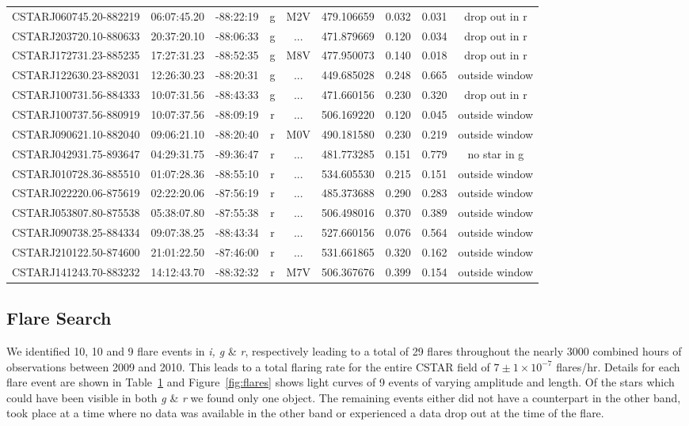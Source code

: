 \begin{landscape}
\begin{table}[H]
\begin{tabular}{ccccccccc}
CSTARJ060745.20-882219 & 06:07:45.20 & -88:22:19 & g & M2V & 479.106659 & 0.032 & 0.031 &   drop out in r \\
CSTARJ203720.10-880633 & 20:37:20.10 & -88:06:33 & g & ... & 471.879669 & 0.120 & 0.034 &   drop out in r \\
CSTARJ172731.23-885235 & 17:27:31.23 & -88:52:35 & g & M8V & 477.950073 & 0.140 & 0.018 &   drop out in r \\
CSTARJ122630.23-882031 & 12:26:30.23 & -88:20:31 & g & ... & 449.685028 & 0.248 & 0.665 &   outside window \\
CSTARJ100731.56-884333 & 10:07:31.56 & -88:43:33 & g & ... & 471.660156 & 0.230 & 0.320 &   drop out in r \\
CSTARJ100737.56-880919 & 10:07:37.56 & -88:09:19 & r & ... & 506.169220 & 0.120 & 0.045 & outside window \\
CSTARJ090621.10-882040 & 09:06:21.10 & -88:20:40 & r & M0V & 490.181580 & 0.230 & 0.219 & outside window \\
CSTARJ042931.75-893647 & 04:29:31.75 & -89:36:47 & r & ... & 481.773285 & 0.151 & 0.779 &   no star in g \\
CSTARJ010728.36-885510 & 01:07:28.36 & -88:55:10 & r & ... & 534.605530 & 0.215 & 0.151 & outside window \\
CSTARJ022220.06-875619 & 02:22:20.06 & -87:56:19 & r & ... & 485.373688 & 0.290 & 0.283 & outside window \\
CSTARJ053807.80-875538 & 05:38:07.80 & -87:55:38 & r & ... & 506.498016 & 0.370 & 0.389 & outside window \\
CSTARJ090738.25-884334 & 09:07:38.25 & -88:43:34 & r & ... & 527.660156 & 0.076 & 0.564 & outside window \\
CSTARJ210122.50-874600 & 21:01:22.50 & -87:46:00 & r & ... & 531.661865 & 0.320 & 0.162 & outside window \\
CSTARJ141243.70-883232 & 14:12:43.70 & -88:32:32 & r & M7V & 506.367676 & 0.399 & 0.154 & outside window \\
\hline
\end{tabular}
\label{tb:flare}
\end{table}
\end{landscape}


\subsection{Flare Search}
We identified 10, 10 and 9 flare events in \textit{i, g} \& \textit{r}, respectively leading to a total of 29 flares throughout the nearly $3000$ combined hours of observations between 2009 and 2010. This leads to a total flaring rate for the entire CSTAR field of $7\pm1\times10^{-7}$ flares/hr. Details for each flare event are shown in Table~\ref{tb:flare} and Figure~\ref{fig:flares} shows light curves of 9 events of varying amplitude and length. Of the stars which could have been visible in both \textit{g} \& \textit{r} we found only one object. The remaining events either did not have a counterpart in the other band, took place at a time where no data was available in the other band or experienced a data drop out at the time of the flare.

